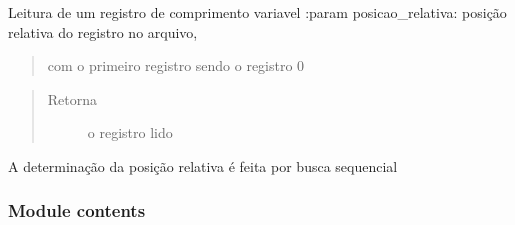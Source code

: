 \documentclass[letterpaper,10pt,brazil]{sphinxmanual}
\begin{document}
\begin{fulllineitems}
\begin{fulllineitems}
\begin{quote}
\begin{description}
\end{description}\end{quote}

\end{fulllineitems}


\begin{fulllineitems}
\label{\detokenize{estrutarq.arquivo:estrutarq.arquivo.arquivo_comum.ArquivoSimples.leia_variavel}}
\pysigstartsignatures
{}
\pysigstopsignatures
\sphinxAtStartPar
Leitura de um registro de comprimento variavel
:param posicao\_relativa: posição relativa do registro no arquivo,
\begin{quote}

\sphinxAtStartPar
com o primeiro registro sendo o registro 0
\end{quote}
\begin{quote}\begin{description}
\item[{Retorna}] \leavevmode
\sphinxAtStartPar
o registro lido

\end{description}\end{quote}

\sphinxAtStartPar
A determinação da posição relativa é feita por busca sequencial

\end{fulllineitems}


\end{fulllineitems}



\subsubsection{Module contents}
\label{\detokenize{estrutarq.arquivo:module-estrutarq.arquivo}}\label{\detokenize{estrutarq.arquivo:module-contents}}
\sphinxstepscope
\end{document}
